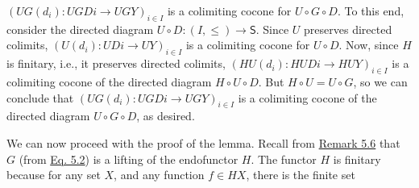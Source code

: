 \documentclass[11pt,a4paper]{amsart}
\begin{document}
\hypertarget{html:S7.SS0.SSS0.P0.SPx1.p2.m8}{}\({(UG(d_{i})\colon UGDi\to UGY)_{i\in I}}\) is a colimiting cocone for %
\hypertarget{html:S7.SS0.SSS0.P0.SPx1.p2.m9}{}\({U\circ G\circ D}\). To this end, consider the directed diagram %
\hypertarget{html:S7.SS0.SSS0.P0.SPx1.p2.m10}{}\({U\circ D\colon(I,\leq)\to\mathsf{S}}\). Since %
\hypertarget{html:S7.SS0.SSS0.P0.SPx1.p2.m11}{}\({U}\) preserves directed colimits, %
\hypertarget{html:S7.SS0.SSS0.P0.SPx1.p2.m12}{}\({(U(d_{i})\colon UDi\to UY)_{i\in I}}\) is a colimiting cocone for %
\hypertarget{html:S7.SS0.SSS0.P0.SPx1.p2.m13}{}\({U\circ D}\). Now, since %
\hypertarget{html:S7.SS0.SSS0.P0.SPx1.p2.m14}{}\({H}\) is finitary, i.e., it preserves directed colimits, %
\hypertarget{html:S7.SS0.SSS0.P0.SPx1.p2.m15}{}\({(HU(d_{i})\colon HUDi\to HUY)_{i\in I}}\) is a colimiting cocone of the directed diagram %
\hypertarget{html:S7.SS0.SSS0.P0.SPx1.p2.m16}{}\({H\circ U\circ D}\). But %
\hypertarget{html:S7.SS0.SSS0.P0.SPx1.p2.m17}{}\({H\circ U=U\circ G}\), so we can conclude that %
\hypertarget{html:S7.SS0.SSS0.P0.SPx1.p2.m18}{}\({(UG(d_{i})\colon UGDi\to UGY)_{i\in I}}\) is a colimiting cocone of the directed diagram %
\hypertarget{html:S7.SS0.SSS0.P0.SPx1.p2.m19}{}\({U\circ G\circ D}\), as desired.
\par\medskip
\hypertarget{html:S7.SS0.SSS0.P0.SPx1.p3}{} We can now proceed with the proof of the lemma. Recall from \hyperlink{html:S5.Thmtheorem6}{Remark 5.6} that %
\hypertarget{html:S7.SS0.SSS0.P0.SPx1.p3.m1}{}\({G}\) (from \hyperlink{html:S5.E2}{Eq. 5.2}) is a lifting of the endofunctor %
\hypertarget{html:S7.SS0.SSS0.P0.SPx1.p3.m2}{}\({H}\). The functor %
\hypertarget{html:S7.SS0.SSS0.P0.SPx1.p3.m3}{}\({H}\) is finitary because for any set %
\hypertarget{html:S7.SS0.SSS0.P0.SPx1.p3.m4}{}\({X}\), and any function %
\hypertarget{html:S7.SS0.SSS0.P0.SPx1.p3.m5}{}\({f\in HX}\), there is the finite set %
\end{document}
